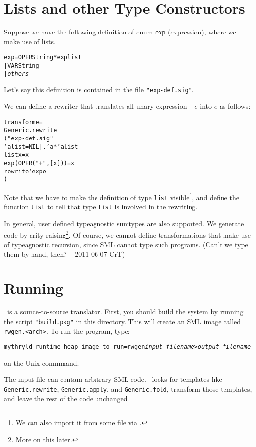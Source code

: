 \section{Lists and other Type Constructors}

Suppose we have the following definition of enum
\verb|exp| (expression), where we make use of lists.
\begin{alltt}
  \SUMTYPE exp = OPER \OF String * exp list
                | VAR \OF String
                | {\em others}
\end{alltt}
Let's say this definition is contained in the file \verb|"exp-def.sig"|.

We can define a rewriter that translates all unary expression $+e$ 
into $e$ as follows:
\begin{alltt}
   \FUN transform e =
   Generic.rewrite
   ( \LET \INCLUDE "exp-def.sig"
          \SUMTYPE 'a list = NIL | . \OF 'a * 'a list 
          \FUN list x = x
          \FUN exp (OPER("+",[x])) = x
     \IN  rewrite'exp e
     \END
   )
\end{alltt}
 Note that we have to make the definition of
type \verb|list| visible\footnote{We can also import it from some file
via \INCLUDE.}, and define the function \verb|list| to tell \RewriteGen{}
that type \verb|list| is involved in the rewriting. 

 In general, user defined typeagnostic sumtypes are also supported.
We generate code by arity raising\footnote{More on this later.}.
 Of course, we cannot define transformations that make use of 
typeagnostic recursion, since SML cannot type such programs.
(Can't we type them by hand, then? -- 2011-06-07 CrT)

\section{Running \RewriteGen}

  \RewriteGen\ is a source-to-source translator.  First, you should
build the system by running the script \verb|"build.pkg"| in this
directory.  This will create an SML image called \verb|rwgen.<arch>|.
To run the program, type:
\begin{alltt}
    mythryld --runtime-heap-image-to-run=rwgen {\em input-filename} > {\em output-filename}
\end{alltt}
\noindent on the Unix commmand.

The input file can contain arbitrary SML code.  \RewriteGen\ looks
for templates like \verb|Generic.rewrite|, \verb|Generic.apply|,
and \verb|Generic.fold|, transform those templates, and
leave the rest of the code unchanged.

